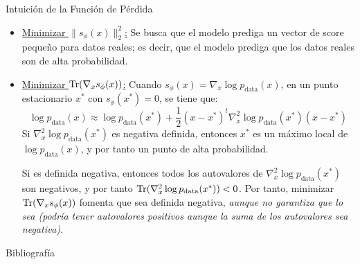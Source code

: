 \documentclass{beamer}
\begin{document}
\begin{frame}{Intuición de la Función de Pérdida}
    \begin{itemize}
        \item \ul{Minimizar $\|s_\phi(x)\|_2^2$:} Se busca que el modelo prediga un vector de score pequeño para datos reales; es decir, que el modelo prediga que los datos reales son de alta probabilidad.\pause
        \item \ul{Minimizar $\operatorname{Tr}(\nabla_x s_\phi(x))$:} Cuando $s_\phi(x)=\nabla_x \log p_\text{data}(x)$, en un punto estacionario $x^*$ con $s_\phi(x^*)=0$, se tiene que:
        \begin{equation*}
            \log p_\text{data}(x) \approx \log p_\text{data}(x^*) + \frac{1}{2}(x-x^*)^t \nabla_x^2 \log p_\text{data}(x^*) (x-x^*)
        \end{equation*}
        \pause
        Si $\nabla_x^2 \log p_\text{data}(x^*)$ es negativa definida, entonces $x^*$ es un máximo local de $\log p_\text{data}(x)$, y por tanto un punto de alta probabilidad.\pause

        Si es definida negativa, entonces todos los autovalores de $\nabla_x^2 \log p_\text{data}(x^*)$ son negativos, y por tanto $\operatorname{Tr}(\nabla_x^2 \log p_\text{data}(x^*)) < 0$. Por tanto, minimizar $\operatorname{Tr}(\nabla_x s_\phi(x))$ fomenta que sea definida negativa, \emph{aunque no garantiza que lo sea (podría tener autovalores positivos aunque la suma de los autovalores sea negativa)}.

    \end{itemize}
\end{frame}







\begin{frame}[allowframebreaks]{Bibliografía}
    \nocite{lai2026principlesdiffusionmodels}
    \printbibliography
\end{frame}
\end{document}
